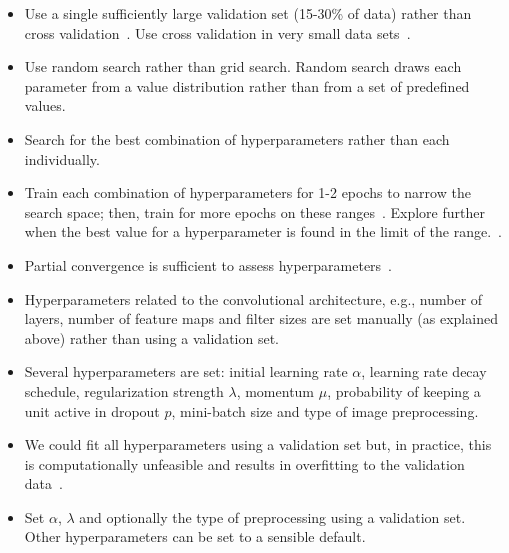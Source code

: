\begin{itemize}
	\item Use a single sufficiently large validation set (15-30\% of data) rather than cross validation~\cite{Bengio2014}. Use cross validation in very small data sets~\cite{Ng2014}.

	\item Use random search rather than grid search. Random search draws each parameter from a value distribution rather than from a set of predefined values.~\cite{Bergstra2012}

	\item Search for the best combination of hyperparameters rather than each individually.

	\item Train each combination of hyperparameters for 1-2 epochs to narrow the search space; then, train for more epochs on these ranges~\cite{Karpathy2015}. Explore further when the best value for a hyperparameter is found in the limit of the range.~\cite{Bengio2012}.

	\item Partial convergence is sufficient to assess hyperparameters~\cite{Karpathy2015}.	


	\item Hyperparameters related to the convolutional architecture, e.g., number of layers, number of feature maps and filter sizes are set manually (as explained above) rather than using a validation set.

	\item Several hyperparameters are set: initial learning rate $\alpha$, learning rate decay schedule, regularization strength $\lambda$, momentum $\mu$, probability of keeping a unit active in dropout $p$, mini-batch size and type of image preprocessing.

	\item We could fit all hyperparameters using a validation set but, in practice, this is computationally unfeasible and results in overfitting to the validation data~\cite{Cawley2010}.

	\item Set $\alpha$, $\lambda$ and optionally the type of preprocessing using a validation set. Other hyperparameters can be set to a sensible default. 


\end{itemize}
